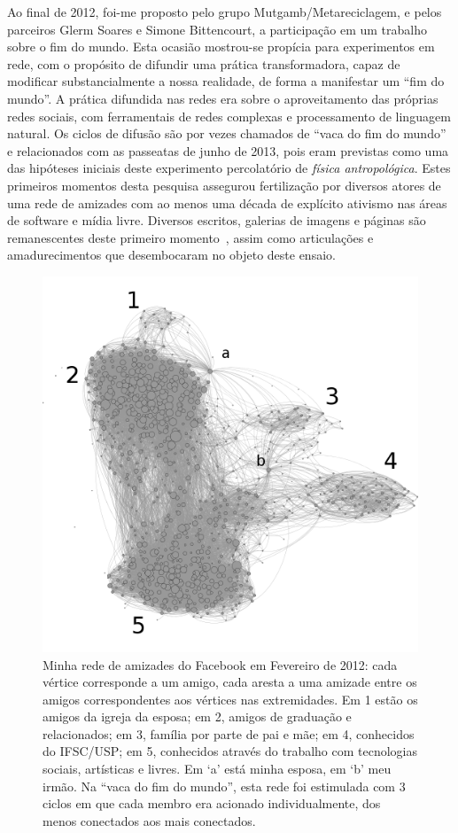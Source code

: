 \documentclass[a4paper, 11pt]{article} %
\begin{document}
Ao final de 2012, foi-me proposto pelo grupo Mutgamb/Metareciclagem, e pelos parceiros Glerm Soares e Simone Bittencourt, a participação  em um trabalho sobre o fim do mundo. Esta ocasião mostrou-se propícia para experimentos em rede, com o propósito de difundir uma prática transformadora, capaz de modificar substancialmente a nossa realidade, de forma a manifestar um ``fim do mundo''. A prática difundida nas redes era sobre o aproveitamento das próprias redes sociais, com ferramentais de redes complexas e processamento de linguagem natural. Os ciclos de difusão são por vezes chamados de ``vaca do fim do mundo'' e relacionados com as passeatas de junho de 2013, pois eram previstas como uma das hipóteses iniciais deste experimento percolatório de \emph{física antropológica}. Estes primeiros momentos desta pesquisa assegurou fertilização por diversos atores de uma rede de amizades com ao menos uma década de explícito ativismo nas áreas de software e mídia livre. Diversos escritos, galerias de imagens e páginas são remanescentes deste primeiro momento~\cite{ciberiun,ars,rc1,rc2}, assim como articulações e amadurecimentos que desembocaram no objeto deste ensaio.
\begin{figure}[H]
  \centering
    \includegraphics[width=.9\textwidth]{rederf.png}
  \caption{\small Minha rede de amizades do Facebook em Fevereiro de 2012: cada vértice corresponde a um amigo, cada aresta a uma amizade entre os amigos correspondentes aos vértices nas extremidades. Em 1 estão os amigos da igreja da esposa; em 2, amigos de graduação e relacionados; em 3, família por parte de pai e mãe; em 4, conhecidos do IFSC/USP; em 5, conhecidos através do trabalho com tecnologias sociais, artísticas e livres. Em `a' está minha esposa, em `b' meu irmão. Na ``vaca do fim do mundo'', esta rede foi estimulada com 3 ciclos em que cada membro era acionado individualmente, dos menos conectados aos mais conectados.}\label{fig:redem}
\end{figure}
\end{document}
